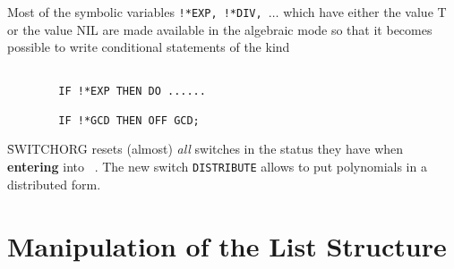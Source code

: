 Most of the symbolic variables {\tt !*EXP, !*DIV, $\ldots$}
which have either the value T or the value NIL are made available in the
algebraic mode so that it  becomes possible to write conditional
statements of the kind
\begin{verbatim}

        IF !*EXP THEN DO ......

        IF !*GCD THEN OFF GCD;

\end{verbatim}
\f{SWITCHORG} resets (almost) {\em all} switches in the status
they have when {\bf entering} into \REDUCE\ .
The  new switch  {\tt DISTRIBUTE} allows to put polynomials in a
distributed form.
\section{Manipulation of the List Structure}

